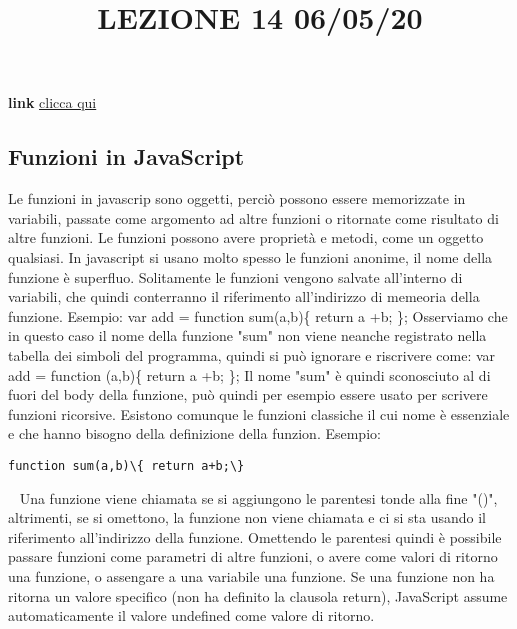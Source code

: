 \title{LEZIONE 14 06/05/20}
\textbf{link} \href{https://web.microsoftstream.com/video/1f9e0781-7149-4a62-851d-de458cb09274?list=user&userId=cfe0965d-9a7c-40e2-be6e-f078296a1914}{clicca qui}
\subsection{Funzioni in JavaScript}
Le funzioni in javascrip sono oggetti, perciò possono essere memorizzate in variabili, passate come argomento ad altre funzioni o ritornate come risultato di altre funzioni. Le funzioni possono avere proprietà e metodi, come un oggetto qualsiasi.\newline
\newline
In javascript si usano molto spesso le funzioni anonime, il nome della funzione è superfluo. Solitamente le funzioni vengono salvate all'interno di variabili, che quindi conterranno il riferimento all'indirizzo di memeoria della funzione.\newline
Esempio:\newline
var add = function sum(a,b)\{ return a +b; \};\newline
Osserviamo che in questo caso il nome della funzione "sum" non viene neanche registrato nella tabella dei simboli del programma, quindi si può ignorare e riscrivere come:\newline
var add = function (a,b)\{ return a +b; \};\newline
Il nome "sum" è quindi sconosciuto al di fuori del body della funzione, può quindi per esempio essere usato per scrivere funzioni ricorsive.\newline
\newline
Esistono comunque le funzioni classiche il cui nome è essenziale e che hanno bisogno della definizione della funzion.\newline
Esempio:
\begin{lstlisting}
function sum(a,b)\{ return a+b;\}
\end{lstlisting}
\ \newline
Una funzione viene chiamata se si aggiungono le parentesi tonde alla fine "()", altrimenti, se si omettono, la funzione non viene chiamata e ci si sta usando il riferimento all'indirizzo della funzione. Omettendo le parentesi quindi è possibile passare funzioni come parametri di altre funzioni, o avere come valori di ritorno una funzione, o assengare a una variabile una funzione.\newline
\newline
Se una funzione non ha ritorna un valore specifico (non ha definito la clausola return), JavaScript assume automaticamente il valore undefined come valore di ritorno.\newline
